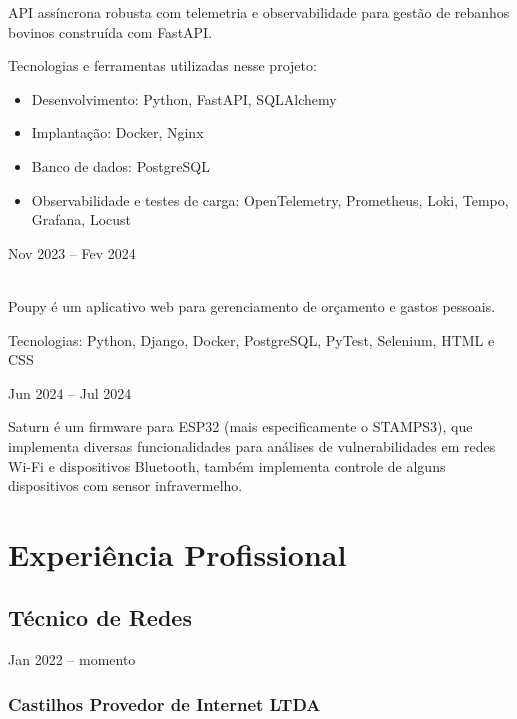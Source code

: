\documentclass{cv}
\begin{document}
API assíncrona robusta com telemetria e observabilidade para gestão
de rebanhos bovinos construída com FastAPI.

\vspace{0.08cm}

Tecnologias e ferramentas utilizadas nesse projeto:

\begin{itemize}
  \item Desenvolvimento: Python, FastAPI, SQLAlchemy
  \item Implantação: Docker, Nginx
  \item Banco de dados: PostgreSQL
  \item Observabilidade e testes de carga: OpenTelemetry, Prometheus,
    Loki, Tempo, Grafana, Locust
\end{itemize}

\hfill{Nov 2023 -- Fev 2024}\\
\\
\vspace{0.15cm}

Poupy é um aplicativo web para gerenciamento de orçamento e gastos pessoais.

\vspace{0.08cm}

Tecnologias: Python, Django, Docker, PostgreSQL, PyTest, Selenium, HTML e CSS

\hfill{Jun 2024 -- Jul 2024}\\
\vspace{0.15cm}

Saturn é um firmware para ESP32 (mais especificamente o STAMPS3), que implementa diversas funcionalidades
para análises de vulnerabilidades em redes Wi-Fi e dispositivos Bluetooth,
também implementa controle de alguns dispositivos com sensor infravermelho.

\section{Experiência Profissional}

\subsection{Técnico de Redes}
{Jan 2022 -- momento}
\subsubsection{Castilhos Provedor de Internet LTDA}
\end{document}
